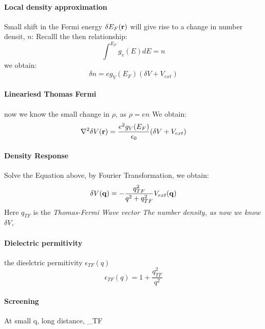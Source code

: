 \documentclass[12pt,a4paper]{article}
\begin{document}
\begin{enumerate}
                \paragraph*{Local density approximation}
                    Small shift in the Fermi energy $\delta E_F(\vb{r})$ will give rise to a change in number densit, $n$:
                    Recalll the then relationship:
                    \begin{equation}
                        \int^{E_F} g_v(E) dE = n
                    \end{equation}
                    we obtain:
                    \begin{equation}
                        \delta n = e g_V(E_F)(\delta V + V_{ext})
                    \end{equation}
                \paragraph*{Lineariesd Thomas Fermi}
                    now we know the small change in $\rho$, as $\rho = e n$
                    We obtain:
                    \begin{equation}
                        \laplacian{\delta V(\vb{r})} = \frac{e^2 g_V(E_F)}{\epsilon_0}(\delta V + V_{ext})
                    \end{equation}
                \paragraph {Density Response}
                    Solve the Equation above, by Fourier Transformation, we obtain:
                    \begin{equation}
                        \delta V(\vb{q}) = -\frac{q^2_{TF}}{q^2+q^2_{TF}}V_{ext}(\vb{q})
                    \end{equation}
                    Here $q_{TF}$ is the \it{Thomas-Fermi Wave vector}
                    The number density, as now we know $\delta V$, 
                \paragraph*{Dielectric permitivity}
                    the dieelctric permitivity $\epsilon_{TF}(q)$
                    \begin{equation}
                        \epsilon_{TF}(q)= 1+ \frac{q_{TF}^2}{q^2}
                    \end{equation}
                \paragraph*{Screening}
                    At small q, long distance, \epsilon_{TF}
                

            \end{enumerate}
\end{document}
